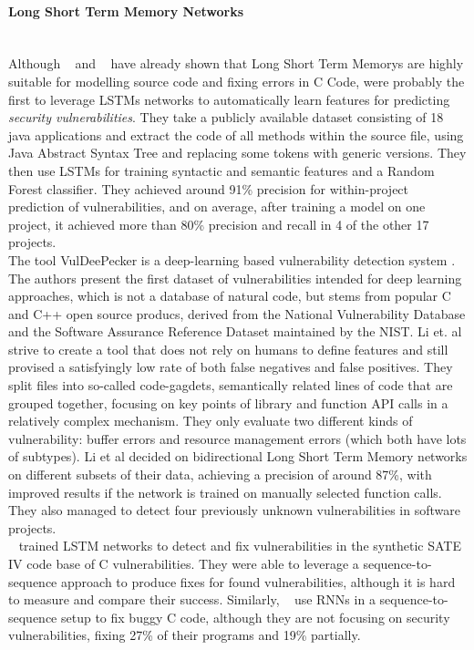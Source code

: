 \documentclass[
	a4paper,
	pagesize,
	pdftex,
	12pt,
	twoside, %
	BCOR=5mm, %
	ngerman,
	fleqn,
	final,
	]{scrartcl}
\begin{document}
\paragraph{Long Short Term Memory Networks}\mbox{}\\
Although ~\cite{Gupta.2017b} and ~\cite{Dam.2016b} have already shown that Long Short Term Memorys are highly suitable for modelling source code and fixing errors in C Code, \cite{Dam.2017} were probably the first to leverage LSTMs networks to automatically learn features for predicting \textit{security vulnerabilities}. They take a publicly available dataset consisting of 18 java applications and extract the code of all methods within the source file, using Java Abstract Syntax Tree and replacing some tokens with generic versions. They then use LSTMs for training syntactic and semantic features and a Random Forest classifier. They achieved around 91\% precision for within-project prediction of vulnerabilities, and on average, after training a model on one project, it achieved more than 80\% precision and recall in 4 of the other 17 projects.\\
The tool VulDeePecker is a deep-learning based vulnerability detection system \cite{Li.2018}. The authors present the first dataset of vulnerabilities intended for deep learning approaches, which is not a database of natural code, but stems from popular C and C++ open source producs, derived from the National Vulnerability Database and the Software Assurance Reference Dataset maintained by the NIST. Li et. al strive to create a tool that does not rely on humans to define features and still provised a satisfyingly low rate of both false negatives and false positives. They split files into so-called code-gagdets, semantically related lines of code that are grouped together, focusing on key points of library and function API calls in a relatively complex mechanism. They only evaluate two different kinds of vulnerability: buffer errors and resource management errors (which both have lots of subtypes). Li et al decided on bidirectional Long Short Term Memory networks on different subsets of their data, achieving a precision of around 87\%, with improved results if the network is trained on manually selected function calls. They also managed to detect four previously unknown vulnerabilities in software projects. \\
~\cite{Harer.2018} trained LSTM networks to detect and fix vulnerabilities in the synthetic SATE IV code base of C vulnerabilities. They were able to leverage a sequence-to-sequence approach to produce fixes for found vulnerabilities, although it is hard to measure and compare their success. Similarly, ~\cite{Gupta.2017} use RNNs in a sequence-to-sequence setup to fix buggy C code, although they are not focusing on security vulnerabilities, fixing 27\% of their programs and 19\% partially.
\end{document}
